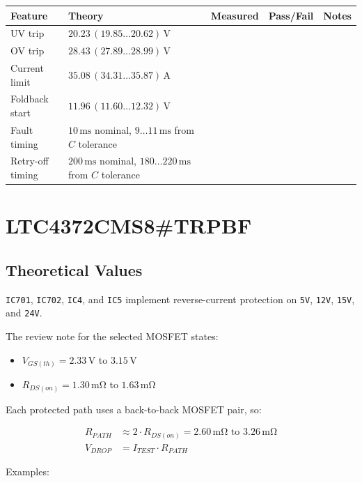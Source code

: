 \documentclass[11pt,a4paper]{article}
\begin{document}
\small
\begin{tabularx}{\textwidth}{p{2.6cm}p{4.0cm}p{2.4cm}p{2.0cm}Y}
\toprule
Feature & Theory & Measured & Pass/Fail & Notes \\
\midrule
UV trip & $20.23\,(19.85\ldots20.62)\,\mathrm{V}$ & & & \\
OV trip & $28.43\,(27.89\ldots28.99)\,\mathrm{V}$ & & & \\
Current limit & $35.08\,(34.31\ldots35.87)\,\mathrm{A}$ & & & \\
Foldback start & $11.96\,(11.60\ldots12.32)\,\mathrm{V}$ & & & \\
Fault timing & $10\,\mathrm{ms}$ nominal, $9\ldots11\,\mathrm{ms}$ from $C$ tolerance & & & \\
Retry-off timing & $200\,\mathrm{ms}$ nominal, $180\ldots220\,\mathrm{ms}$ from $C$ tolerance & & & \\
\bottomrule
\end{tabularx}
\normalsize

\section{LTC4372CMS8\#TRPBF}

\subsection{Theoretical Values}

\texttt{IC701}, \texttt{IC702}, \texttt{IC4}, and \texttt{IC5} implement reverse-current protection on \texttt{5V}, \texttt{12V}, \texttt{15V}, and \texttt{24V}.

The review note for the selected MOSFET states:

\begin{itemize}
\item $V_{GS(th)} = 2.33\,\mathrm{V}$ to $3.15\,\mathrm{V}$
\item $R_{DS(on)} = 1.30\,\mathrm{m\Omega}$ to $1.63\,\mathrm{m\Omega}$
\end{itemize}

Each protected path uses a back-to-back MOSFET pair, so:

\begin{align}
R_{PATH} &\approx 2 \cdot R_{DS(on)} = 2.60\,\mathrm{m\Omega} \text{ to } 3.26\,\mathrm{m\Omega} \\
V_{DROP} &= I_{TEST} \cdot R_{PATH}
\end{align}

Examples:
\end{document}
